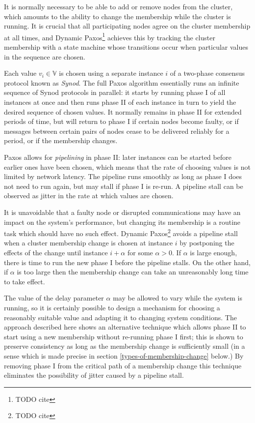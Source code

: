 \documentclass[journal]{IEEEtran}
\begin{document}
It is normally necessary to be able to add or remove nodes from the cluster,
which amounts to the ability to change the membership while the cluster is
running. It is crucial that all participating nodes agree on the cluster
membership at all times, and Dynamic Paxos\footnote{TODO cite} achieves this by
tracking the cluster membership with a state machine whose transitions occur
when particular values in the sequence are chosen.

Each value $v_i \in \mathbb V$ is chosen using a separate instance $i$ of a
two-phase consensus protocol known as \textit{Synod}. The full Paxos algorithm
essentially runs an infinite sequence of Synod protocols in parallel: it starts
by running phase I of all instances at once and then runs phase II of each
instance in turn to yield the desired sequence of chosen values. It normally
remains in phase II for extended periods of time, but will return to phase I if
certain nodes become faulty, or if messages between certain pairs of nodes
cease to be delivered reliably for a period, or if the membership changes.

Paxos allows for \textit{pipelining} in phase II: later instances can be
started before earlier ones have been chosen, which means that the rate of
choosing values is not limited by network latency. The pipeline runs smoothly
as long as phase I does not need to run again, but may stall if phase I is
re-run. A pipeline stall can be observed as jitter in the rate at which values
are chosen.

It is unavoidable that a faulty node or disrupted communications may have an
impact on the system's performance, but changing its membership is a routine
task which should have no such effect. Dynamic Paxos\footnote{TODO cite} avoids
a pipeline stall when a cluster membership change is chosen at instance $i$ by
postponing the effects of the change until instance $i + \alpha$ for some
$\alpha > 0$. If $\alpha$ is large enough, there is time to run the new phase I
before the pipeline stalls.  On the other hand, if $\alpha$ is too large then
the membership change can take an unreasonably long time to take effect.

The value of the delay parameter $\alpha$ may be allowed to vary while the
system is running, so it is certainly possible to design a mechanism for
choosing a reasonably suitable value and adapting it to changing system
conditions. The approach described here shows an alternative technique which
allows phase II to start using a new membership without re-running phase I
first; this is shown to preserve consistency as long as the membership change
is sufficiently small (in a sense which is made precise in section
\ref{types-of-membership-change} below.) By removing phase I from the critical
path of a membership change this technique eliminates the possibility of jitter
caused by a pipeline stall.
\end{document}
